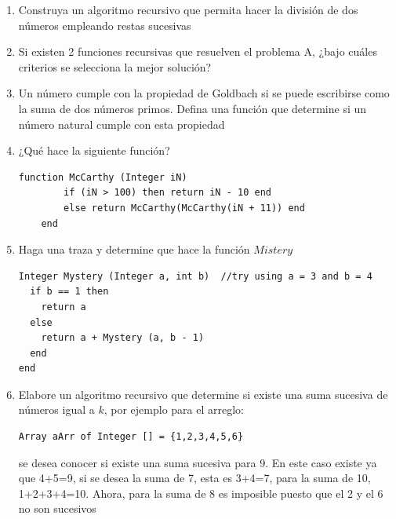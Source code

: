 \begin{enumerate}
\item Construya un algoritmo recursivo que permita hacer la división de dos números empleando restas sucesivas
\item Si existen 2 funciones recursivas que resuelven el problema A, ¿bajo cuáles criterios se selecciona la mejor solución?
\item Un número cumple con la propiedad de Goldbach si se puede escribirse como la suma de dos números primos. Defina una función que determine si un número natural cumple con esta propiedad
\item ¿Qué hace la siguiente función?
	\begin{lstlisting}[upquote=true, language=pseudo]
	function McCarthy (Integer iN)
    	if (iN > 100) then return iN - 10 end
    	else return McCarthy(McCarthy(iN + 11)) end
    end
	\end{lstlisting}
\item Haga una traza y determine que hace la función $Mistery$
\begin{lstlisting}[upquote=true, language=pseudo]
Integer Mystery (Integer a, int b)	//try using a = 3 and b = 4
  if b == 1 then
	return a
  else
    return a + Mystery (a, b - 1)
  end
end
\end{lstlisting}
\item Elabore un algoritmo recursivo que determine si existe una suma sucesiva de números igual a $k$, por ejemplo para el arreglo:
\begin{lstlisting}[upquote=true, language=pseudo]
Array aArr of Integer [] = {1,2,3,4,5,6}
\end{lstlisting}
\noindent se desea conocer si existe una suma sucesiva para 9. En este caso existe ya que 4+5=9, si se desea la suma de 7, esta es 3+4=7, para la suma de 10, 1+2+3+4=10. Ahora, para la suma de 8 es imposible puesto que el 2 y el 6 no son sucesivos
\end{enumerate}